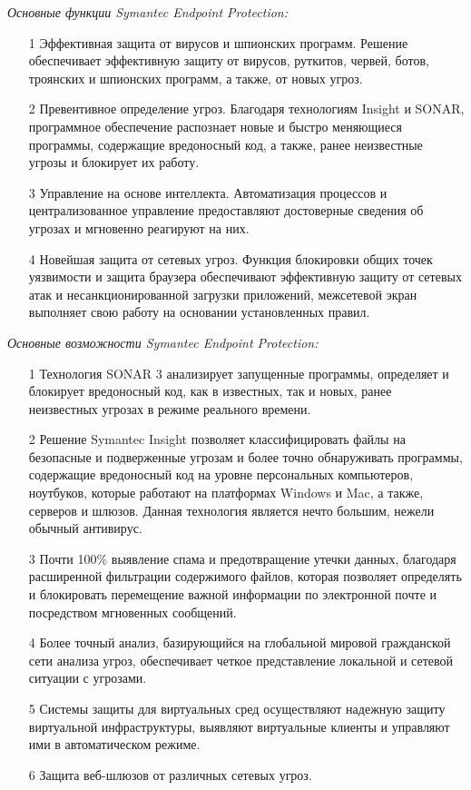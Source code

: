 \textit{Основные функции Symantec Endpoint Protection:}
\begin{itemize}
    \item[1] Эффективная защита от вирусов и шпионских программ. Решение обеспечивает эффективную защиту от вирусов, руткитов, червей, ботов, троянских и шпионских программ, а также, от новых угроз.
    \item[2] Превентивное определение угроз. Благодаря технологиям Insight и SONAR, программное обеспечение распознает новые и быстро меняющиеся программы, содержащие вредоносный код, а также, ранее неизвестные угрозы и блокирует их работу.
    \item[3] Управление на основе интеллекта. Автоматизация процессов и централизованное управление предоставляют достоверные сведения об угрозах и мгновенно реагируют на них.
    \item[4] Новейшая защита от сетевых угроз. Функция блокировки общих точек уязвимости и защита браузера обеспечивают эффективную защиту от сетевых атак и несанкционированной загрузки приложений, межсетевой экран выполняет свою работу на основании установленных правил.
\end{itemize}

\textit{Основные возможности Symantec Endpoint Protection:}
\begin{itemize}
    \item[1] Технология SONAR 3 анализирует запущенные программы, определяет и блокирует вредоносный код, как в известных, так и новых, ранее неизвестных угрозах в режиме реального времени.
    \item[2] Решение Symantec Insight позволяет классифицировать файлы на безопасные и подверженные угрозам и более точно обнаруживать программы, содержащие вредоносный код на уровне персональных компьютеров, ноутбуков, которые работают на платформах Windows и Mac, а также, серверов и шлюзов. Данная технология является нечто большим, нежели обычный антивирус.
    \item[3] Почти 100\% выявление спама и предотвращение утечки данных, благодаря расширенной фильтрации содержимого файлов, которая позволяет определять и блокировать перемещение важной информации по электронной почте и посредством мгновенных сообщений.
    \item[4] Более точный анализ, базирующийся на глобальной мировой гражданской сети анализа угроз, обеспечивает четкое представление локальной и сетевой ситуации с угрозами.
    \item[5] Системы защиты для виртуальных сред осуществляют надежную защиту виртуальной инфраструктуры, выявляют виртуальные клиенты и управляют ими в автоматическом режиме.
    \item[6] Защита веб-шлюзов от различных сетевых угроз.
\end{itemize}

